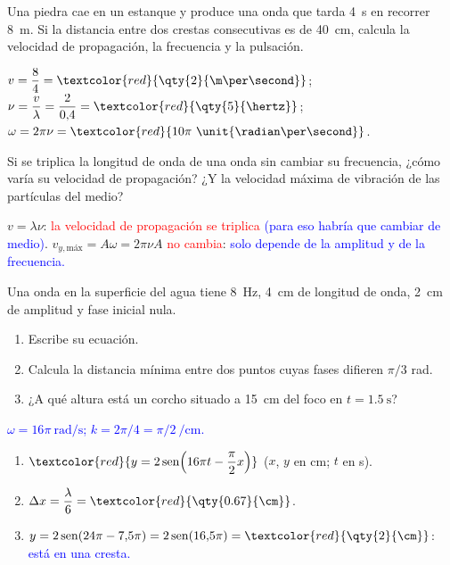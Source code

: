 \begin{exercise}
    Una piedra cae en un estanque y produce una onda que tarda \qty{4}{\second} en recorrer \qty{8}{\m}. Si la distancia
    entre dos crestas consecutivas es de \qty{40}{\cm}, calcula la velocidad de propagación, la frecuencia y la pulsación.
    \begin{solu}
        \(v = \dfrac{8}{4} = \textcolor{red}{\qty{2}{\m\per\second}}\); \(\nu = \dfrac{v}{\lambda} = \dfrac{2}{0{,}4} = \textcolor{red}{\qty{5}{\hertz}}\);
        \(\omega = 2\pi\nu = \textcolor{red}{10\pi\ \unit{\radian\per\second}}\).
    \end{solu}
\end{exercise}

\begin{exercise}
    Si se triplica la longitud de onda de una onda sin cambiar su frecuencia, ¿cómo varía su velocidad de propagación? ¿Y la
    velocidad máxima de vibración de las partículas del medio?
    \begin{solu}
        \(v = \lambda\nu\): \textcolor{red}{la velocidad de propagación se triplica} \textcolor{blue}{(para eso habría que cambiar de medio)}.
        \(v_{y,\text{máx}} = A\omega = 2\pi\nu A\) \textcolor{red}{no cambia}: \textcolor{blue}{solo depende de la amplitud y de la frecuencia.}
    \end{solu}
\end{exercise}

\begin{exercise}
    Una onda en la superficie del agua tiene \qty{8}{\hertz}, \qty{4}{\cm} de longitud de onda, \qty{2}{\cm} de amplitud y
    fase inicial nula.
    \begin{enumerate}[label=\letraminuscula]
        \item Escribe su ecuación.
        \item Calcula la distancia mínima entre dos puntos cuyas fases difieren \(\pi/3\) rad.
        \item ¿A qué altura está un corcho situado a \qty{15}{\cm} del foco en \(t = \qty{1.5}{\second}\)?
    \end{enumerate}
    \begin{solu}
        \textcolor{blue}{\(\omega = 16\pi\ \unit{\radian\per\second}\); \(k = 2\pi/4 = \pi/2\ \unit{\per\cm}\).}
        \begin{enumerate}[label=\letraminuscula]
            \item \(\textcolor{red}{y = 2\sen\!\left(16\pi t - \dfrac{\pi}{2}x\right)}\) (\(x\), \(y\) en cm; \(t\) en s).
            \item \(\Delta x = \dfrac{\lambda}{6} = \textcolor{red}{\qty{0.67}{\cm}}\).
            \item \(y = 2\sen(24\pi - 7{,}5\pi) = 2\sen(16{,}5\pi) = \textcolor{red}{\qty{2}{\cm}}\): \textcolor{blue}{está en una cresta.}
        \end{enumerate}
    \end{solu}
\end{exercise}

